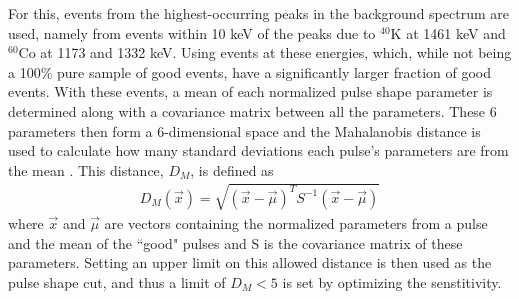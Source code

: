 For this, events from the highest-occurring peaks in the background spectrum are used, namely from events within 10 keV of the peaks due to $^{40}$K at 1461 keV and $^{60}$Co at 1173 and 1332 keV.
Using events at these energies, which, while not being a 100\% pure sample of good events, have a significantly larger fraction of good events.
With these events, a mean of each normalized pulse shape parameter is determined along with a covariance matrix between all the parameters.
These 6 parameters then form a 6-dimensional space and the Mahalanobis distance is used to calculate how many standard deviations each pulse's parameters are from the mean \cite{mahalanobis1936generalized}.
This distance, $D_M$, is defined as
\begin{align}
    D_M(\Vec{x}) = \sqrt{(\Vec{x}-\Vec{\mu})^TS^{-1}(\Vec{x}-\Vec{\mu})}
\end{align}
where $\Vec{x}$ and $\Vec{\mu}$ are vectors containing the normalized parameters from a pulse and the mean of the ``good" pulses and S is the covariance matrix of these parameters.
Setting an upper limit on this allowed distance is then used as the pulse shape cut, and thus a limit of $D_M<5$ is set by optimizing the senstitivity.


